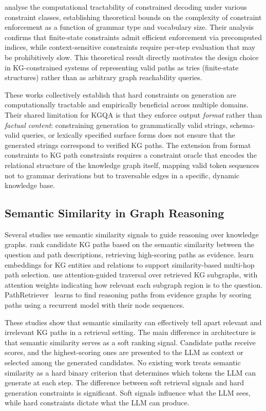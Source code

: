 \citet{zhang2023tractable} analyse the computational tractability of constrained decoding under various constraint classes, establishing theoretical bounds on the complexity of constraint enforcement as a function of grammar type and vocabulary size. Their analysis confirms that finite-state constraints admit efficient enforcement via precomputed indices, while context-sensitive constraints require per-step evaluation that may be prohibitively slow. This theoretical result directly motivates the design choice in KG-constrained systems of representing valid paths as tries (finite-state structures) rather than as arbitrary graph reachability queries.

These works collectively establish that hard constraints on generation are computationally tractable and empirically beneficial across multiple domains. Their shared limitation for KGQA is that they enforce output \textit{format} rather than \textit{factual content}: constraining generation to grammatically valid strings, schema-valid queries, or lexically specified surface forms does not ensure that the generated strings correspond to verified KG paths. The extension from format constraints to KG path constraints requires a constraint oracle that encodes the relational structure of the knowledge graph itself, mapping valid token sequences not to grammar derivations but to traversable edges in a specific, dynamic knowledge base.

\subsection{Semantic Similarity in Graph Reasoning}

Several studies use semantic similarity signals to guide reasoning over knowledge graphs. \citet{shi2021kgpath} rank candidate KG paths based on the semantic similarity between the question and path descriptions, retrieving high-scoring paths as evidence. \citet{saxena2022kgqa} learn embeddings for KG entities and relations to support similarity-based multi-hop path selection. \citet{he2021multihop} use attention-guided traversal over retrieved KG subgraphs, with attention weights indicating how relevant each subgraph region is to the question. PathRetriever~\citep{asai2019learning} learns to find reasoning paths from evidence graphs by scoring paths using a recurrent model with their node sequences.

These studies show that semantic similarity can effectively tell apart relevant and irrelevant KG paths in a retrieval setting. The main difference in architecture is that semantic similarity serves as a soft ranking signal. Candidate paths receive scores, and the highest-scoring ones are presented to the LLM as context or selected among the generated candidates. No existing work treats semantic similarity as a hard binary criterion that determines which tokens the LLM can generate at each step. The difference between soft retrieval signals and hard generation constraints is significant. Soft signals influence what the LLM sees, while hard constraints dictate what the LLM can produce.

